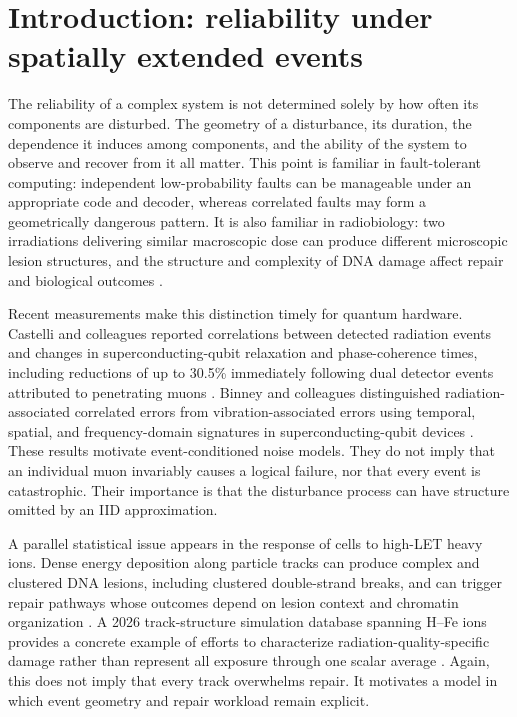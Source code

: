 \documentclass[11pt,a4paper,oneside]{article}
\begin{document}
\section{Introduction: reliability under spatially extended events}
\label{sec:introduction}
The reliability of a complex system is not determined solely by how often its components are disturbed. The geometry of a disturbance, its duration, the dependence it induces among components, and the ability of the system to observe and recover from it all matter. This point is familiar in fault-tolerant computing: independent low-probability faults can be manageable under an appropriate code and decoder, whereas correlated faults may form a geometrically dangerous pattern. It is also familiar in radiobiology: two irradiations delivering similar macroscopic dose can produce different microscopic lesion structures, and the structure and complexity of DNA damage affect repair and biological outcomes \citep{Dennis2002,Fowler2012,Hagiwara2019,Goodhead2024,Wilkinson2023}.

Recent measurements make this distinction timely for quantum hardware. Castelli and colleagues reported correlations between detected radiation events and changes in superconducting-qubit relaxation and phase-coherence times, including reductions of up to 30.5\% immediately following dual detector events attributed to penetrating muons \citep{Castelli2026}. Binney and colleagues distinguished radiation-associated correlated errors from vibration-associated errors using temporal, spatial, and frequency-domain signatures in superconducting-qubit devices \citep{Binney2026}. These results motivate event-conditioned noise models. They do not imply that an individual muon invariably causes a logical failure, nor that every event is catastrophic. Their importance is that the disturbance process can have structure omitted by an IID approximation.

A parallel statistical issue appears in the response of cells to high-LET heavy ions. Dense energy deposition along particle tracks can produce complex and clustered DNA lesions, including clustered double-strand breaks, and can trigger repair pathways whose outcomes depend on lesion context and chromatin organization \citep{Hagiwara2019,Shibata2022,Goodhead2024}. A 2026 track-structure simulation database spanning H--Fe ions provides a concrete example of efforts to characterize radiation-quality-specific damage rather than represent all exposure through one scalar average \citep{Huang2026}. Again, this does not imply that every track overwhelms repair. It motivates a model in which event geometry and repair workload remain explicit.
\end{document}
